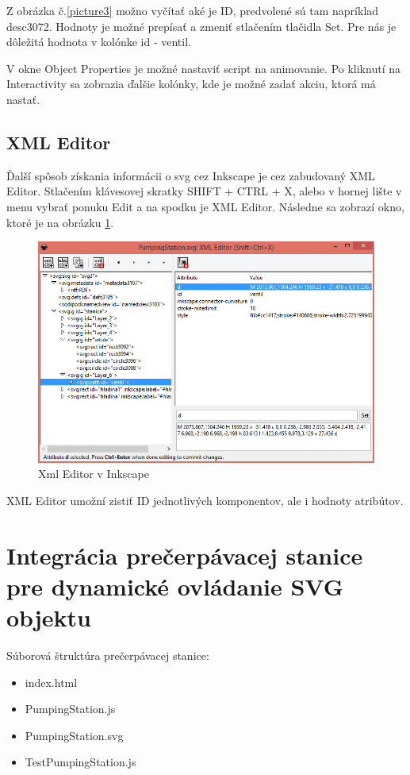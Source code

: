 Z obrázka č.\ref{picture3} možno vyčítať aké je ID, predvolené sú tam napríklad desc3072. Hodnoty je možné prepísať a zmeniť stlačením tlačidla Set. Pre nás je dôležitá hodnota v kolónke id - ventil. 

V okne Object Properties je možné nastaviť script na animovanie. Po kliknutí na Interactivity sa zobrazia ďalšie kolónky, kde je možné zadať akciu, ktorá má nastať.  


\subsection{XML Editor}
Ďalší spôsob získania informácii o svg cez Inkscape je cez zabudovaný XML Editor.
Stlačením klávesovej skratky SHIFT + CTRL + X, alebo v hornej lište v menu vybrať ponuku Edit a na spodku je XML Editor. Následne sa zobrazí okno, ktoré je na obrázku \ref{xmlEditor}.
\begin{figure}[H]
	\begin{center}
		\includegraphics[width=0.6\linewidth]  {obrazky/XmlEditor2.png}
		\caption{Xml Editor v Inkscape}
		\label{xmlEditor}
	\end{center}
\end{figure}

XML Editor umožní zistiť ID jednotlivých komponentov, ale i hodnoty atribútov. 


\section{Integrácia prečerpávacej stanice pre dynamické ovládanie SVG objektu}

Súborová štruktúra prečerpávacej stanice: 
\begin{itemize}
	\item index.html 
	\item PumpingStation.js
	\item PumpingStation.svg
	\item TestPumpingStation.js
\end{itemize}

